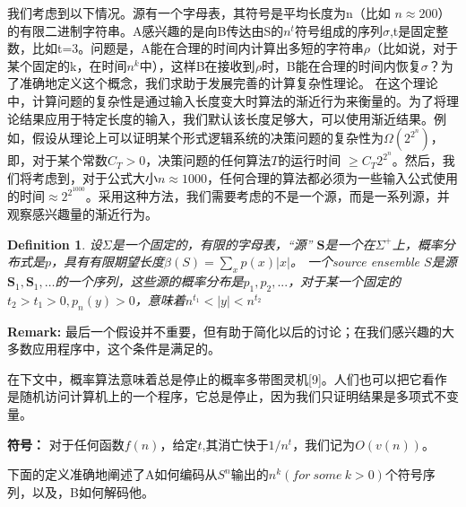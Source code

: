 \documentclass[]{article}
\newtheorem{definition}{Definition}
\begin{document}
我们考虑到以下情况。源有一个字母表，其符号是平均长度为n（比如 $n\approx 200$）的有限二进制字符串。A感兴趣的是向B传达由S的$n^t$符号组成的序列$\sigma$,t是固定整数，比如t=3。问题是，A能在合理的时间内计算出多短的字符串$\rho$（比如说，对于某个固定的k，在时间$n^k$中），这样B在接收到$\rho$时，B能在合理的时间内恢复$\sigma$？为了准确地定义这个概念，我们求助于发展完善的计算复杂性理论。
在这个理论中，计算问题的复杂性是通过输入长度变大时算法的渐近行为来衡量的。为了将理论结果应用于特定长度的输入，我们默认该长度足够大，可以使用渐近结果。例如，假设从理论上可以证明某个形式逻辑系统的决策问题的复杂性为$\Omega(2^{2^n})$，即，对于某个常数$C_T>0$，决策问题的任何算法$T$的运行时间
$\geq C_T2^{2^n}$。然后，我们将考虑到，对于公式大小$n\approx 1000$，任何合理的算法都必须为一些输入公式使用的时间$\approx 2^{2^{1000}}$。采用这种方法，我们需要考虑的不是一个源，而是一系列源，并观察感兴趣量的渐近行为。\par

\begin{definition}
	设$\Sigma$是一个固定的，有限的字母表，“源” $\mathbf{S}$是一个在$\Sigma^+$上，概率分布式是$p$，具有有限期望长度$\beta(S)=\sum_{x}p(x)|x|$。
	一个source ensemble $S$是源$\mathbf{S}_1,\mathbf{S}_1,\ldots$的一个序列，这些源的概率分布是$p_1,p_2,...$，对于某一个固定的$t_2>t_1>0,p_n(y)>0$，意味着$n^{t_1}<|y|< n^{t_2}$
\end{definition}

\textbf{Remark: }\hspace{0.5cm} 最后一个假设并不重要，但有助于简化以后的讨论；在我们感兴趣的大多数应用程序中，这个条件是满足的。


在下文中，概率算法意味着总是停止的概率多带图灵机[9]。人们也可以把它看作是随机访问计算机上的一个程序，它总是停止，因为我们只证明结果是多项式不变量。

\textbf{符号：}\hspace{0.5cm} 对于任何函数$f(n)$，给定$t$,其消亡快于$1/n^t$，我们记为$O(v(n))$。

下面的定义准确地阐述了A如何编码从$S^n$输出的$n^k(for\ some\ k > 0)$个符号序列，以及，B如何解码他。
\end{document}
